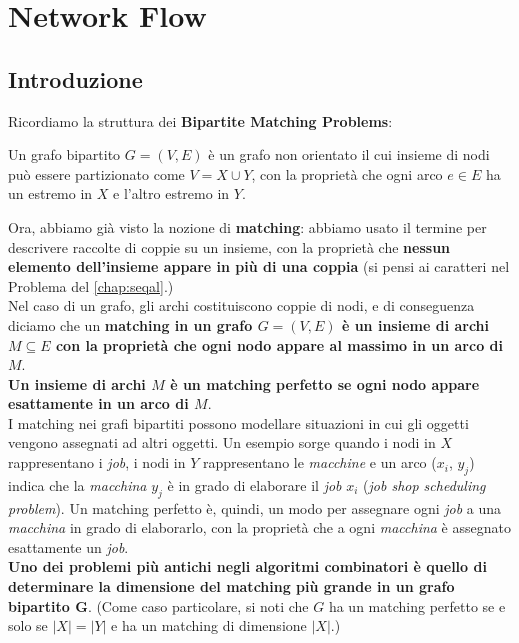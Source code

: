 \chapter{Network Flow}

\section{Introduzione}

Ricordiamo la struttura dei \textbf{Bipartite Matching Problems}:
\begin{myblockquote}
  Un grafo bipartito $G = (V , E)$ è un grafo non
  orientato il cui insieme di nodi può essere partizionato come
  $V = X \cup Y$, con la proprietà che ogni arco $e \in E$ ha un
  estremo in $X$ e l'altro estremo in $Y$.
\end{myblockquote}

Ora, abbiamo già visto la nozione di \textbf{matching}: abbiamo usato il
termine per descrivere raccolte di coppie su un insieme, con la
proprietà che \textbf{nessun elemento dell'insieme appare in più di una
  coppia} (si pensi ai caratteri nel Problema del
\protect\autoref{chap:seqal}.)\\

Nel caso di un grafo, gli archi costituiscono coppie di nodi, e di
conseguenza diciamo che un \textbf{matching in un grafo $G = (V , E)$
  è un insieme di archi $M \subseteq E$ con la proprietà che ogni nodo
  appare al massimo in un arco di $M$}.\\

\textbf{Un insieme di archi $M$ è un matching perfetto se ogni nodo
  appare esattamente in un arco di $M$}.\\

I matching nei grafi bipartiti possono modellare situazioni in cui gli
oggetti vengono assegnati ad altri oggetti. Un esempio sorge quando i
nodi in $X$ rappresentano i \emph{job}, i nodi in $Y$ rappresentano
le \emph{macchine} e un arco ($x_i$, $y_j$) indica che la
\emph{macchina} $y_j$ è in grado di elaborare il \emph{job} $x_i$
(\emph{job shop scheduling problem}). Un matching perfetto è, quindi, un
modo per assegnare ogni \emph{job} a una \emph{macchina} in grado di
elaborarlo, con la proprietà che a ogni \emph{macchina} è assegnato
esattamente un \emph{job}.\\

\textbf{Uno dei problemi più antichi negli algoritmi combinatori è
  quello di determinare la dimensione del matching più grande in un grafo
  bipartito G}. (Come caso particolare, si noti che $G$ ha un matching
perfetto se e solo se $|X| = |Y|$ e ha un matching di dimensione
$|X|$.)\\

